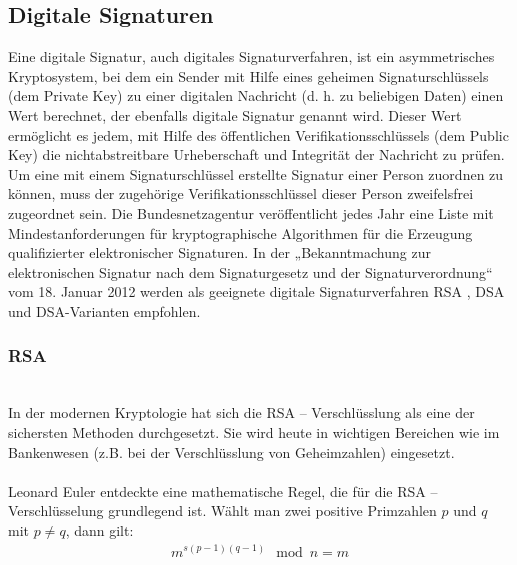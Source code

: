 \subsection{Digitale Signaturen}
Eine digitale Signatur, auch digitales Signaturverfahren, ist ein asymmetrisches Kryptosystem, bei dem ein Sender mit Hilfe eines geheimen Signaturschlüssels (dem Private Key) zu einer digitalen Nachricht (d. h. zu beliebigen Daten) einen Wert berechnet, der ebenfalls digitale Signatur genannt wird. Dieser Wert ermöglicht es jedem, mit Hilfe des öffentlichen Verifikationsschlüssels (dem Public Key) die nichtabstreitbare Urheberschaft und Integrität der Nachricht zu prüfen. Um eine mit einem Signaturschlüssel erstellte Signatur einer Person zuordnen zu können, muss der zugehörige Verifikationsschlüssel dieser Person zweifelsfrei zugeordnet sein.
Die Bundesnetzagentur veröffentlicht jedes Jahr eine Liste mit Mindestanforderungen für kryptographische Algorithmen für die Erzeugung qualifizierter elektronischer Signaturen. In der „Bekanntmachung zur elektronischen Signatur nach dem Signaturgesetz und der Signaturverordnung“ vom 18. Januar 2012 werden als geeignete digitale Signaturverfahren RSA , DSA und DSA-Varianten empfohlen. 
\subsubsection{RSA}\hspace*{\fill} \\
In der modernen Kryptologie hat sich die RSA \cite{bellare1996exact} – Verschlüsslung als eine der
sichersten Methoden durchgesetzt. Sie wird heute in wichtigen Bereichen wie  im
Bankenwesen (z.B. bei der Verschlüsslung von Geheimzahlen) eingesetzt.
\\\\
Leonard Euler entdeckte eine mathematische Regel, die für die RSA –
Verschlüsselung grundlegend ist. Wählt man zwei positive Primzahlen $p$ und $q$ mit $p \neq q$, dann gilt:
\begin{equation}
	\begin{split}
		m^{s(p-1)(q-1)}\mod n = m
 	\end{split}
\end{equation}

